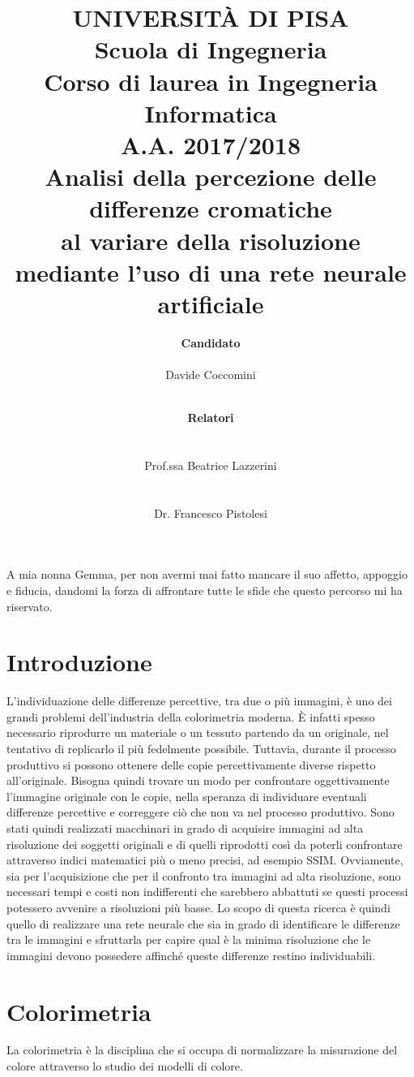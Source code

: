 \documentclass[a4paper,11pt]{article}
\author{
        \rule{0in}{0pt}\textbf{\Large Candidato} \\
        \rule{0in}{0pt}Davide Coccomini \\
        \and
        \rule{1.2in}{0pt}\textbf{\Large Relatori}\\
        \rule{1.2in}{0pt}Prof.ssa Beatrice Lazzerini\\
        \rule{1.2in}{0pt}Dr. Francesco Pistolesi 
    }
\title{\textbf{UNIVERSITÀ DI PISA} \\[0.4in]
    Scuola di Ingegneria \\
    Corso di laurea in Ingegneria Informatica \\
    A.A. 2017/2018\\[0.7in]
    Analisi della percezione delle differenze cromatiche\\
    al variare della risoluzione mediante l'uso di una rete neurale artificiale\\[0.8in]}
\date{}
\begin{document}
    \pagestyle{fancy}
    \fancyhf{}
    \fancyhead[L]{\rightmark}
    
    \fancyfoot{}
    \fancyfoot[LE,RO]{\thepage}    
    \renewcommand{\footrulewidth}{0.4pt}
    \maketitle
    \newpage
    
    \vspace*{\fill}
    A mia nonna Gemma, per non avermi mai fatto mancare il suo affetto, appoggio e fiducia, dandomi la forza di affrontare tutte le sfide che questo percorso mi ha riservato.
    \vspace*{\fill}
    \newpage
        \tableofcontents
        \newpage
        \section{Introduzione}
        L'individuazione delle differenze percettive, tra due o più immagini, è uno dei grandi problemi dell'industria della colorimetria moderna. È infatti spesso necessario riprodurre un materiale o un tessuto partendo da un originale, nel tentativo di replicarlo il più fedelmente possibile. 
        Tuttavia, durante il processo produttivo si possono ottenere delle copie percettivamente diverse rispetto all'originale.
        Bisogna quindi trovare un modo per confrontare oggettivamente l'immagine originale con le copie, nella speranza di individuare eventuali differenze percettive e correggere ciò che non va nel processo produttivo. 
        Sono stati quindi realizzati macchinari in grado di acquisire immagini ad alta risoluzione dei soggetti originali e di quelli riprodotti così da poterli confrontare attraverso indici matematici più o meno precisi, ad esempio SSIM.
        Ovviamente, sia per l'acquisizione che per il confronto tra immagini ad alta risoluzione, sono necessari tempi e costi non indifferenti che sarebbero abbattuti se questi processi potessero avvenire a risoluzioni più basse.
        Lo scopo di questa ricerca è quindi quello di realizzare una rete neurale che sia in grado di identificare le differenze tra le immagini e sfruttarla per capire qual è la minima risoluzione che le immagini devono possedere affinché queste differenze restino individuabili.
    
        \newpage
        \section{Colorimetria}
        La colorimetria è la disciplina che si occupa di normalizzare la misurazione del colore attraverso lo studio dei modelli di colore.
\end{document}
